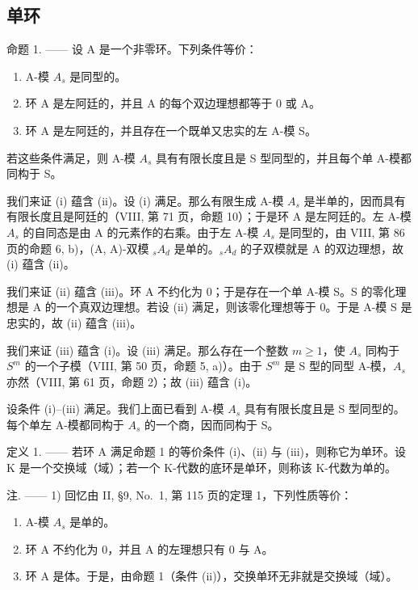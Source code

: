 \subsection{单环}

命题 1. —— 设 A 是一个非零环。下列条件等价：

\begin{enumerate}
\def\labelenumi{(\roman{enumi})}
\item
  A-模 \(A_{s}\) 是同型的。
\item
  环 A 是左阿廷的，并且 A 的每个双边理想都等于 0 或 A。
\item
  环 A 是左阿廷的，并且存在一个既单又忠实的左 A-模 S。
\end{enumerate}

若这些条件满足，则 A-模 \(A_{s}\) 具有有限长度且是 S 型同型的，并且每个单 A-模都同构于 S。

我们来证 (i) 蕴含 (ii)。设 (i) 满足。那么有限生成 A-模 \(A_{s}\) 是半单的，因而具有有限长度且是阿廷的（VIII, 第 71 页，命题 10）；于是环 A 是左阿廷的。左 A-模 \(A_{s}\) 的自同态是由 A 的元素作的右乘。由于左 A-模 \(A_{s}\) 是同型的，由 VIII, 第 86 页的命题 6, b)，(A, A)-双模 \(_{s}A_{d}\) 是单的。\(_{s}A_{d}\) 的子双模就是 A 的双边理想，故 (i) 蕴含 (ii)。

我们来证 (ii) 蕴含 (iii)。环 A 不约化为 0；于是存在一个单 A-模 S。S 的零化理想是 A 的一个真双边理想。若设 (ii) 满足，则该零化理想等于 0。于是 A-模 S 是忠实的，故 (ii) 蕴含 (iii)。

我们来证 (iii) 蕴含 (i)。设 (iii) 满足。那么存在一个整数 \(m \geqslant 1\)，使 \(A_{s}\) 同构于 \(S^{m}\) 的一个子模（VIII, 第 50 页，命题 5, a)）。由于 \(S^{m}\) 是 S 型的同型 A-模，\(A_{s}\) 亦然（VIII, 第 61 页，命题 2）；故 (iii) 蕴含 (i)。

设条件 (i)–(iii) 满足。我们上面已看到 A-模 \(A_{s}\) 具有有限长度且是 S 型同型的。每个单左 A-模都同构于 \(A_{s}\) 的一个商，因而同构于 S。

定义 1. —— 若环 A 满足命题 1 的等价条件 (i)、(ii) 与 (iii)，则称它为单环。设 K 是一个交换域（域）；若一个 K-代数的底环是单环，则称该 K-代数为单的。

注. —— 1) 回忆由 II, §9, No.~1, 第 115 页的定理 1，下列性质等价：

\begin{enumerate}
\def\labelenumi{(\roman{enumi})}
\item
  A-模 \(A_{s}\) 是单的。
\item
  环 A 不约化为 0，并且 A 的左理想只有 0 与 A。
\item
  环 A 是体。于是，由命题 1（条件 (ii)），交换单环无非就是交换域（域）。
\end{enumerate}

